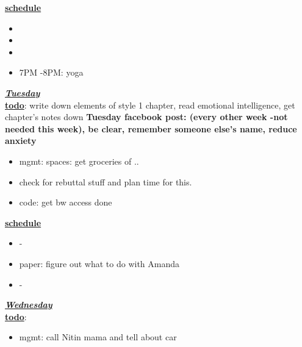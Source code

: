 \underline{\textbf{schedule}}\\
\begin{itemize}
\item
\item
\item
\item 7PM -8PM: yoga
\end{itemize}

\underline{\textbf{\textit{Tuesday}}}\\
\underline{\textbf{todo}}: write down elements of style 1 chapter, read emotional intelligence, get chapter's notes down 
\textbf{Tuesday facebook post: (every other week -not needed this week), be clear, remember someone else's name, reduce anxiety} \\
\begin{itemize}
\item mgmt: spaces: get groceries of ..
\item check for rebuttal stuff and plan time for this.
\item code: get bw access done
\end{itemize}

\underline{\textbf{schedule}}\\
\begin{itemize}
\item -
\item paper: figure out what to do with Amanda
\item  -
\end{itemize}

\underline{\textbf{\textit{Wednesday}}}\\
\underline{\textbf{todo}}:
\begin{itemize}
\item mgmt: call Nitin mama and tell about car
\end{itemize}

